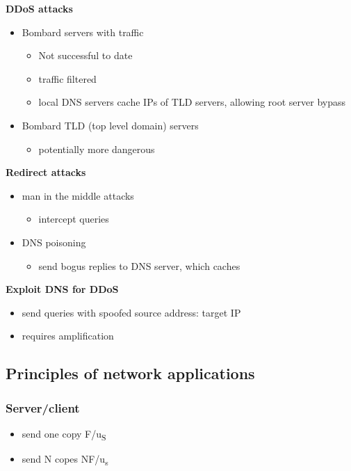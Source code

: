 \documentclass[11pt]{article}
\begin{document}
\textbf{DDoS attacks}
\begin{itemize}
\item Bombard servers with traffic
\begin{itemize}
\item Not successful to date
\item traffic filtered
\item local DNS servers cache IPs of TLD servers, allowing root server
bypass
\end{itemize}
\item Bombard TLD (top level domain) servers
\begin{itemize}
\item potentially more dangerous
\end{itemize}
\end{itemize}

\textbf{Redirect attacks}
\begin{itemize}
\item man in the middle attacks
\begin{itemize}
\item intercept queries
\end{itemize}
\item DNS poisoning
\begin{itemize}
\item send bogus replies to DNS server, which caches
\end{itemize}
\end{itemize}

\textbf{Exploit DNS for DDoS}
\begin{itemize}
\item send queries with spoofed source address: target IP
\item requires amplification
\end{itemize}

\subsection{Principles of network applications}
\label{sec:orged38310}
\subsubsection{Server/client}
\label{sec:orgad126af}
\begin{itemize}
\item send one copy F/u\textsubscript{S}
\item send N copes NF/u\textsubscript{s}
\end{itemize}
\end{document}

